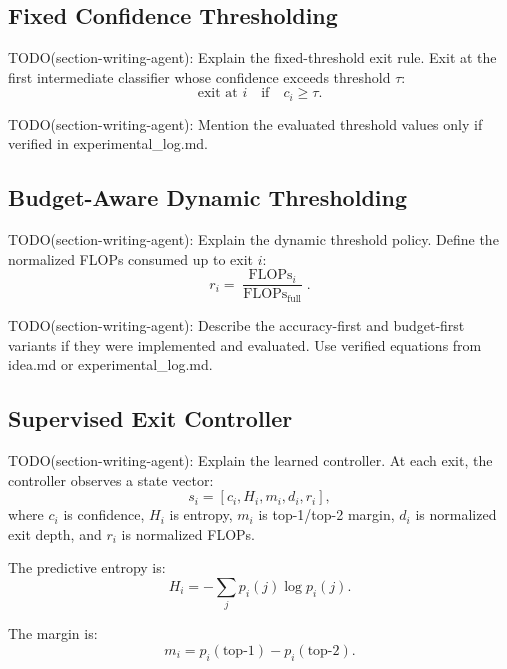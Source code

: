 \documentclass[10pt,twocolumn]{article}
\begin{document}
\subsection{Fixed Confidence Thresholding}

TODO(section-writing-agent): Explain the fixed-threshold exit rule. Exit at the first intermediate classifier whose confidence exceeds threshold $\tau$:
\begin{equation}
    \text{exit at } i
    \quad \text{if} \quad
    c_i \geq \tau.
\end{equation}

TODO(section-writing-agent): Mention the evaluated threshold values only if verified in experimental_log.md.

\subsection{Budget-Aware Dynamic Thresholding}

TODO(section-writing-agent): Explain the dynamic threshold policy. Define the normalized FLOPs consumed up to exit $i$:
\begin{equation}
    r_i =
    \frac{\operatorname{FLOPs}_i}
    {\operatorname{FLOPs}_{\text{full}}}.
\end{equation}

TODO(section-writing-agent): Describe the accuracy-first and budget-first variants if they were implemented and evaluated. Use verified equations from idea.md or experimental_log.md.

\subsection{Supervised Exit Controller}

TODO(section-writing-agent): Explain the learned controller. At each exit, the controller observes a state vector:
\begin{equation}
    s_i = [c_i, H_i, m_i, d_i, r_i],
\end{equation}
where $c_i$ is confidence, $H_i$ is entropy, $m_i$ is top-1/top-2 margin, $d_i$ is normalized exit depth, and $r_i$ is normalized FLOPs.

The predictive entropy is:
\begin{equation}
    H_i = -\sum_j p_i(j)\log p_i(j).
\end{equation}

The margin is:
\begin{equation}
    m_i = p_i(\text{top-1}) - p_i(\text{top-2}).
\end{equation}
\end{document}
